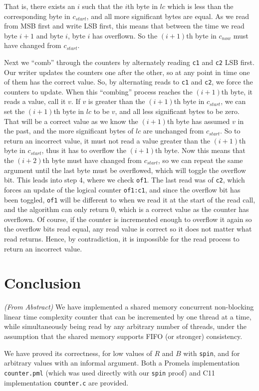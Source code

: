 \documentclass[a4paper]{scrartcl}
\begin{document}
That is, there exists an \(i\) such that the \(i\)th byte in \(lc\) which is less than the corresponding byte in \(c_{start}\), and all more significant bytes are equal. As we read from MSB first and write LSB first, this means that between the time we read byte \(i + 1\) and byte \(i\), byte \(i\) has overflown. So the \((i + 1)\)th byte in \(c_{now}\) must have changed from \(c_{start}\).

Next we ``comb'' through the counters by alternately reading \texttt{c1} and \texttt{c2} LSB first. Our writer updates the counters one after the other, so at any point in time one of them has the correct value. So, by alternating reads to \texttt{c1} and \texttt{c2}, we force the counters to update. When this ``combing'' process reaches the \((i + 1)\)th byte, it reads a value, call it \(v\). If \(v\) is greater than the \((i + 1)\)th byte in \(c_{start}\), we can set the \((i + 1)\)th byte in \(lc\) to be \(v\), and all less significant bytes to be zero. That will be a correct value as we know the \((i + 1)\)th byte has assumed \(v\) in the past, and the more significant bytes of \(lc\) are unchanged from \(c_{start}\). So to return an incorrect value, it must not read a value greater than the \((i + 1)\)th byte in \(c_{start}\), thus it has to overflow the \((i + 1)\)th byte. Now this means that the \((i + 2)\)th byte must have changed from \(c_{start}\), so we can repeat the same argument until the last byte must be overflowed, which will toggle the overflow bit. This leads into step 4, where we check \texttt{of1}. The last read was of \texttt{c2}, which forces an update of the logical counter \texttt{of1:c1}, and since the overflow bit has been toggled, \texttt{of1} will be different to when we read it at the start of the read call, and the algorithm can only return 0, which is a correct value as the counter has overflown. Of course, if the counter is incremented enough to overflow it again so the overflow bits read equal, any read value is correct so it does not matter what read returns. Hence, by contradiction, it is impossible for the read process to return an incorrect value.

\section{Conclusion}
\emph{(From Abstract)} We have implemented a shared memory concurrent non-blocking linear time complexity counter that can be incremented by one thread at a time, while simultaneously being read by any arbitrary number of threads, under the assumption that the shared memory supports FIFO (or stronger) consistency.

We have proved its correctness, for low values of \(R\) and \(B\) with \texttt{spin}, and for arbitrary values with an informal argument. Both a Promela implementation \texttt{counter.pml} (which was used directly with our \texttt{spin} proof) and C11 implementation \texttt{counter.c} are provided.
\end{document}
